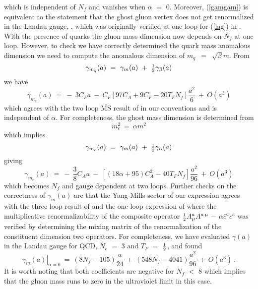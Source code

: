 \documentclass[a4paper,11pt]{article}
\newcommand{\half}{\mbox{\small{$\frac{1}{2}$}}}
\newcommand{\Nc}{N_{\!c}}
\newcommand{\Nf}{N_{\!f}}
\newcommand{\MSbar}{\overline{\mbox{MS}}}
\begin{document}
which is independent of $\Nf$ and vanishes when $\alpha$ $=$ $0$. Moreover, 
(\ref{gamgam}) is equivalent to the statement that the ghost gluon vertex does
not get renormalized in the Landau gauge, \cite{29,30}, which was originally 
verified at one loop for (\ref{lag}) in \cite{29}. With the presence of quarks 
the gluon mass dimension now depends on $\Nf$ at one loop. However, to check we
have correctly determined the quark mass anomalous dimension we need to compute
the anomalous dimension of $m_q$~$=$~$\sqrt{\beta} m$. From  
\begin{equation}  
\gamma_{m_q}(a) ~=~ \gamma_m(a) ~+~ \half \gamma_\beta(a) 
\end{equation}  
we have 
\begin{equation} 
\gamma_{m_q}(a) ~=~ -~ 3 C_F a ~-~ C_F \left[ 97 C_A + 9 C_F - 20 T_F \Nf 
\right] \frac{a^2}{6} ~+~ O(a^3) 
\end{equation} 
which agrees with the two loop $\MSbar$ result of \cite{31,32} in our 
conventions and is independent of $\alpha$. For completeness, the ghost mass 
dimension is determined from 
\begin{equation} 
m^2_c ~=~ \alpha m^2 
\end{equation} 
which implies 
\begin{equation} 
\gamma_{m_c}(a) ~=~ \gamma_m(a) ~+~ \half \gamma_\alpha(a) 
\end{equation}  
giving 
\begin{equation} 
\gamma_{m_c}(a) ~=~ -~ \frac{3}{8} C_A a ~-~ \left[ \left( 18 \alpha + 95
\right) C_A^2 - 40 T_F \Nf \right] \frac{a^2}{96} ~+~ O(a^3) 
\end{equation} 
which becomes $\Nf$ and gauge dependent at two loops. Further checks on the
correctness of $\gamma_m(a)$ are that the Yang-Mills sector of our expression 
agrees with the three loop result of \cite{3} and the one loop expression of
\cite{33} where the multiplicative renormalizability of the composite operator 
$\half A^a_\mu A^{a \, \mu}$ $-$ $\alpha \bar{c}^a c^a$ was verified by 
determining the mixing matrix of the renormalization of the constituent 
dimension two operators. For completeness, we have evaluated $\gamma(a)$ in the 
Landau gauge for QCD, $\Nc$ $=$ $3$ and $T_F$ $=$ $\half$, and found
\begin{equation}
\left. \gamma_m(a) \right|_{\alpha=0} ~=~ \left( 8 \Nf - 105 \right) 
\frac{a}{24} ~+~ \left( 548 \Nf - 4041 \right) \frac{a^2}{96} ~+~ O(a^3) ~.  
\end{equation} 
It is worth noting that both coefficients are negative for $\Nf$ $<$ $8$ which
implies that the gluon mass runs to zero in the ultraviolet limit in this case. 
\end{document}
